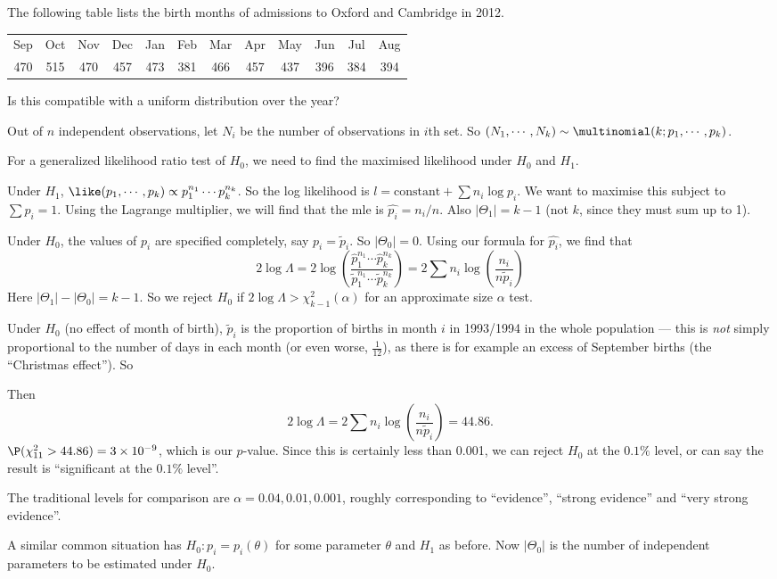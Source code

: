 \documentclass[a4paper]{article}
\begin{document}
\begin{eg}
  The following table lists the birth months of admissions to Oxford and Cambridge in 2012.
  \begin{center}
    \begin{tabular}{cccccccccccc}
      \toprule
      Sep & Oct & Nov & Dec & Jan & Feb & Mar & Apr & May & Jun & Jul & Aug\\
      470 & 515 & 470 & 457 & 473 & 381 & 466 & 457 & 437 & 396 & 384 & 394\\
      \bottomrule
    \end{tabular}
  \end{center}
  Is this compatible with a uniform distribution over the year?

  Out of $n$ independent observations, let $N_i$ be the number of observations in $i$th set. So $(N_1,\cdots, N_k)\sim \multinomial(k; p_1, \cdots, p_k)$.

  For a generalized likelihood ratio test of $H_0$, we need to find the maximised likelihood under $H_0$ and $H_1$.

  Under $H_1$, $\like(p_1, \cdots, p_k) \propto p_1^{n_1}\cdots p_k^{n_k}$. So the log likelihood is $l = \text{constant} + \sum n_i \log p_i$. We want to maximise this subject to $\sum p_i = 1$. Using the Lagrange multiplier, we will find that the mle is $\hat{p_i} = n_i/n$. Also $|\Theta_1| = k - 1$ (not $k$, since they must sum up to 1).

  Under $H_0$, the values of $p_i$ are specified completely, say $p_i = \tilde{p}_i$. So $|\Theta_0| = 0$. Using our formula for $\hat{p_i}$, we find that
  \[
    2\log \Lambda = 2\log\left(\frac{\hat{p}_1^{n_1}\cdots \hat{p}_k^{n_k}}{\tilde{p}_{1}^{n_1}\cdots \tilde{p}_k^{n_k}}\right) = 2\sum n_i \log \left(\frac{n_i}{n\tilde{p}_i}\right)\tag{1}
  \]
  Here $|\Theta_1| - |\Theta_0| = k - 1$. So we reject $H_0$ if $2\log \Lambda > \chi_{k - 1}^2(\alpha)$ for an approximate size $\alpha$ test.

  Under $H_0$ (no effect of month of birth), $\tilde{p}_i$ is the proportion of births in month $i$ in 1993/1994 in the whole population --- this is \emph{not} simply proportional to the number of days in each month (or even worse, $\frac{1}{12}$), as there is for example an excess of September births (the ``Christmas effect''). So

  Then
  \[
    2\log \Lambda = 2\sum n_i \log\left(\frac{n_i}{n\tilde{p}_i}\right) = 44.86.
  \]
  $\P(\chi_{11}^2 > 44.86) = 3\times 10^{-9}$, which is our $p$-value. Since this is certainly less than 0.001, we can reject $H_0$ at the $0.1\%$ level, or can say the result is ``significant at the $0.1\%$ level''.

  The traditional levels for comparison are $\alpha = 0.04, 0.01, 0.001$, roughly corresponding to ``evidence'', ``strong evidence'' and ``very strong evidence''.
\end{eg}
A similar common situation has $H_0: p_i = p_i(\theta)$ for some parameter $\theta$ and $H_1$ as before. Now $|\Theta_0|$ is the number of independent parameters to be estimated under $H_0$.
\end{document}
